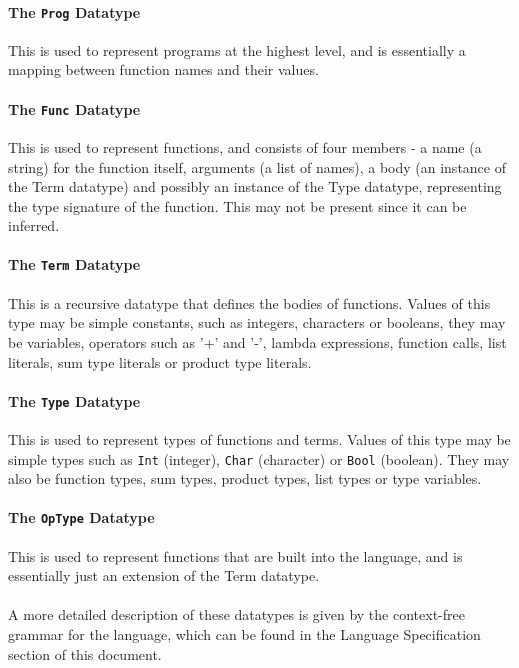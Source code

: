 \documentclass{article}
\begin{document}
\paragraph{The \texttt{Prog} Datatype \\}
This is used to represent programs at the highest level, and is essentially a mapping between function names and their values.
\paragraph{The \texttt{Func} Datatype \\}
This is used to represent functions, and consists of four members - a name (a string) for the function itself, arguments (a list of names), a body (an instance of the Term datatype) and possibly an instance of the Type datatype, representing the type signature of the function. This may not be present since it can be inferred.
\paragraph{The \texttt{Term} Datatype \\}
This is a recursive datatype that defines the bodies of functions. Values of this type may be simple constants, such as integers, characters or booleans, they may be variables, operators such as '+' and '-', lambda expressions, function calls, list literals, sum type literals or product type literals.
\paragraph{The \texttt{Type} Datatype \\}
This is used to represent types of functions and terms. Values of this type may be simple types such as \texttt{Int} (integer), \texttt{Char} (character) or \texttt{Bool} (boolean). They may also be function types, sum types, product types, list types or type variables.
\paragraph{The \texttt{OpType} Datatype \\}
This is used to represent functions that are built into the language, and is essentially just an extension of the Term datatype.
\\\\ A more detailed description of these datatypes is given by the context-free grammar for the language, which can be found in the Language Specification section of this document.
\end{document}
